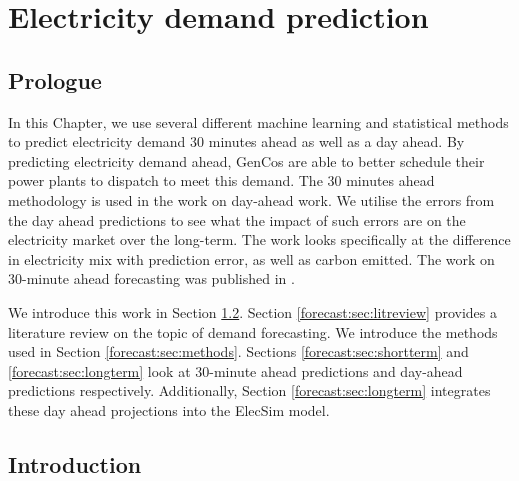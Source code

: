 \chapter{Electricity demand prediction}
\label{chapter:demand}
\ifpdf
\graphicspath{{Chapter3/Figs/Raster/}{Chapter3/Figs/PDF/}{Chapter3/Figs/}}
\else
\graphicspath{{Chapter3/Figs/Vector/}{Chapter3/Figs/}}
\fi


\section{Prologue}

In this Chapter, we use several different machine learning and statistical methods to predict electricity demand 30 minutes ahead as well as a day ahead. By predicting electricity demand ahead, GenCos are able to better schedule their power plants to dispatch to meet this demand. The 30 minutes ahead methodology is used in the work on day-ahead work. We utilise the errors from the day ahead predictions to see what the impact of such errors are on the electricity market over the long-term. The work looks specifically at the difference in electricity mix with prediction error, as well as carbon emitted. The work on 30-minute ahead forecasting was published in \cite{Kell2018a}. 

We introduce this work in Section \ref{forecast:sec:introduction}. Section \ref{forecast:sec:litreview} provides a literature review on the topic of demand forecasting. We introduce the methods used in Section \ref{forecast:sec:methods}. Sections \ref{forecast:sec:shortterm} and \ref{forecast:sec:longterm} look at 30-minute ahead predictions and day-ahead predictions respectively. Additionally, Section \ref{forecast:sec:longterm} integrates these day ahead projections into the ElecSim model. 

\section{Introduction}
\label{forecast:sec:introduction}



